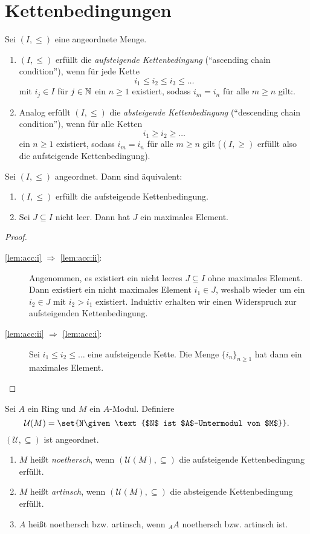 \documentclass[12pt,a4paper]{scrartcl}
\theoremstyle{cplain}
\theoremstyle{cdef}
\begin{document}
\section{Kettenbedingungen}
\begin{defi}
	Sei $(I, \le)$ eine angeordnete Menge.
	\begin{enumerate}
		\item $(I,\leq)$ erfüllt die \emph{aufsteigende Kettenbedingung} (\enquote{ascending chain condition}), wenn für jede Kette
		\[i_1\leq i_2\leq i_3\leq \dots\]
		mit $i_j\in I$ für $j\in \mathbb N$ ein $n\geq 1$ existiert, sodass $i_m = i_n$ für alle $m\geq n$ gilt:.
		\item Analog erfüllt $(I,\leq)$ die \emph{absteigende Kettenbedingung} (\enquote{descending chain condition}), wenn für alle Ketten
		\[i_1\geq i_2\geq \dots \]
		ein $n\geq 1$ existiert, sodass $i_m = i_n$ für alle $m\geq n$ gilt ($(I,\geq)$ erfüllt also die aufsteigende Kettenbedingung).
	\end{enumerate}
\end{defi}
\begin{lem} \label{lem:acc}
	Sei $(I,\leq)$ angeordnet. Dann sind äquivalent:
	\begin{enumerate}
		\item $(I,\leq)$ erfüllt die aufsteigende Kettenbedingung. \label{lem:acc:i}
		\item Sei $J\subseteq I$ nicht leer. Dann hat $J$ ein maximales Element. \label{lem:acc:ii}
	\end{enumerate}
\end{lem}
\begin{proof}
	\leavevmode
	\begin{description}
		\item[\ref{lem:acc:i} $\Rightarrow$ \ref{lem:acc:ii}:] Angenommen, es existiert ein nicht leeres $J\subseteq I$ ohne maximales Element. Dann existiert ein nicht maximales Element $i_1\in J$, weshalb wieder um ein $i_2\in J$ mit $i_2>i_1$ existiert. Induktiv erhalten wir einen Widerspruch zur aufsteigenden Kettenbedingung.
		\item[\ref{lem:acc:ii} $\Rightarrow$ \ref{lem:acc:i}:] Sei $i_1\leq i_2\leq\dots$ eine aufsteigende Kette. Die Menge $\{i_n\}_{n\geq 1}$ hat dann ein maximales Element.
		\qedhere
	\end{description}
\end{proof}
\begin{defi}
	Sei $A$ ein Ring und $M$ ein $A$-Modul. Definiere
	\[\mathcal{U}(M) = \set{N\given \text{$N$ ist $A$-Untermodul von $M$}}.\]
	$(\mathcal{U}, \subseteq)$ ist angeordnet.
	\begin{enumerate}
		\item $M$ heißt \emph{noethersch}, wenn $(\mathcal{U}(M),\subseteq)$ die aufsteigende Kettenbedingung erfüllt.
		\item $M$ heißt \emph{artinsch}, wenn $(\mathcal{U}(M), \subseteq)$ die absteigende Kettenbedingung erfüllt.
		\item $A$ heißt noethersch bzw. artinsch, wenn ${}_AA$ noethersch bzw. artinsch ist.
	\end{enumerate}
\end{defi}
\end{document}
